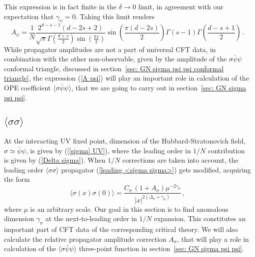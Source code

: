 \documentclass[aps,amsmath,amssymb,prd,showpacs,floatfix,preprint,superscriptaddress,nofootinbib,12pt]{article}
\begin{document}
This expression is in fact finite in the $\delta\rightarrow 0$ limit, in agreement with
our expectation that $\gamma_\psi = 0$. Taking this limit renders
\begin{equation}
\label{A psi}
A_\psi = \frac{1}{N}\frac{2^{d-s-1} (d-2 s+2)}{\sqrt{\pi } \Gamma \left(\frac{d+s}{2}\right)
\sin \left(\frac{\pi  s}{2}\right)}
  \sin \left(\frac{ \pi  (d-2 s)}{2}\right) \Gamma (s-1) \Gamma \left(\frac{d-s+1}{2} \right)\,.
\end{equation}
While propagator amplitudes are not a part of universal CFT data,
in combination with the other non-observable, given by the amplitude
of the $\sigma\bar\psi\psi$ conformal triangle, discussed in section~\ref{sec: GN sigma psi psi conformal triangle},
the expression (\ref{A psi}) will play an important role in calculation of the OPE
coefficient $\langle \sigma\bar\psi\psi\rangle$, that we are going to carry out in
section~\ref{sec: GN sigma psi psi}.



\subsection{$\langle\sigma\sigma\rangle$}
\label{sec: GN sigma prop}

At the interacting UV fixed point, dimension of the Hubbard-Stratonovich
field, $\sigma\simeq \bar\psi\psi$, is given by (\ref{[sigma] UV}),
where the leading order in $1/N$ contribution is given by (\ref{Delta sigma}).
When $1/N$ corrections are taken into account, the 
leading order $\langle\sigma\sigma\rangle$ propagator (\ref{leading <sigma sigma>})
gets modified, acquiring the form
\begin{equation}
\langle\sigma (x)\sigma (0)\rangle
=\frac{C_\sigma\,(1+A_\sigma)\mu^{-2\gamma_\sigma}}{|x|^{2(\Delta_\sigma+\gamma_\sigma)}}\,,
\end{equation}
where $\mu$ is an arbitrary scale.
Our goal in this section is to find anomalous dimension $\gamma_\sigma$
at the next-to-leading order in $1/N$ expansion. This constitutes 
an important part of CFT data of the corresponding critical theory.
We will also calculate the relative propagator amplitude correction
$A_\sigma$, that will play a role in calculation of
the  $\langle \sigma\bar\psi\psi\rangle$  three-point
function in section~\ref{sec: GN sigma psi psi}.
\end{document}
